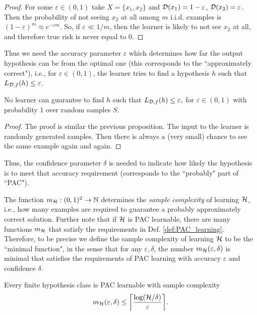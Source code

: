 \documentclass[11pt,a4paper]{article}
\begin{document}
\begin{proof}
For some $\varepsilon\in (0,1)$ take $X = \{x_1,x_2\}$ and $\mathcal{D}(x_1) = 1 - \varepsilon$, $\mathcal{D}(x_2) = \varepsilon$. Then the probability of not seeing $x_2$ at all among $m$ i.i.d. examples is $(1-\varepsilon)^m\approx e^{-\varepsilon m}$. So, if $\varepsilon \ll 1/m$, then the learner is likely to not see $x_2$ at all, and therefore true risk is never equal to $0$.
\end{proof}

Thus we need the accuracy parameter $\varepsilon$ which determines how far the output hypothesis can be from the optimal one (this corresponds to the ``approximately correct"), i.e., for $\varepsilon\in (0,1)$, the learner tries to find a hypothesis $h$ such that $L_{\mathcal{D}, f}(h)\le \varepsilon$.

\begin{proposition}
No learner can guarantee to find $h$ such that $L_{\mathcal{D}, f}(h) \le \varepsilon,$ for $\varepsilon\in (0,1)$ with probability $1$ over random samples $S$.
\end{proposition}

\begin{proof}
The proof is similar the previous proposition. The input to the learner is randomly generated samples. Then there is always a (very small) chance to see the same example again and again.
\end{proof}

Thus, the confidence parameter $\delta$ is needed to indicate how likely the hypothesis is to meet that accuracy requirement (corresponds to the ``probably" part of ``PAC").

\begin{remark}
The function $m_{\mathcal{H}}:(0,1)^2\rightarrow \mathbb{N}$ determines the \textit{sample complexity} of learning $\mathcal{H}$, i.e., how many examples are required to guarantee a probably approximately correct solution. Further note that if $\mathcal{H}$ is PAC learnable, there are many functions $m_{\mathcal{H}}$ that satisfy the requirements in Def. \ref{def:PAC_learning}. Therefore, to be precise we define the sample complexity of learning $\mathcal{H}$ to be the ``minimal function", in the sense that for any $\varepsilon, \delta$, the number $m_{\mathcal{H}}(\varepsilon,\delta)$ is minimal that satisfies the requirements of PAC learning with accuracy $\varepsilon$ and confidence $\delta$.
\end{remark}

\begin{corollary}
Every finite hypothesis class is PAC learnable with sample complexity 
\begin{equation*}
m_{\mathcal{H}}(\varepsilon,\delta) \le \bigg\lceil \dfrac{\log(\mathcal{H}/\delta)}{\varepsilon} \bigg\rceil.
\end{equation*}
\end{corollary}
\end{document}

